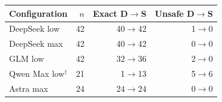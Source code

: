 \begin{tabular}{@{}lrrr@{}}
\toprule
Configuration & $n$ & Exact D$\to$S & Unsafe D$\to$S\\
\midrule
DeepSeek low & 42 & 40$\to$42 & 1$\to$0\\
DeepSeek max & 42 & 40$\to$42 & 0$\to$0\\
GLM low & 42 & 32$\to$36 & 2$\to$0\\
Qwen Max low$^\dagger$ & 21 & 1$\to$13 & 5$\to$6\\
Astra max & 24 & 24$\to$24 & 0$\to$0\\
\bottomrule
\end{tabular}

